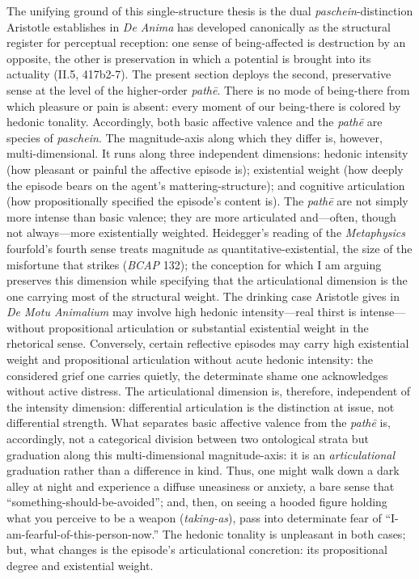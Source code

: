 \documentclass{article}
\begin{document}
The unifying ground of this single-structure thesis is the dual \textit{paschein}-distinction Aristotle establishes in \textit{De Anima} has developed canonically as the structural register for perceptual reception: one sense of being-affected is destruction by an opposite, the other is preservation in which a potential is brought into its actuality (II.5, 417b2-7). The present section deploys the second, preservative sense at the level of the higher-order \textit{pathē}. There is no mode of being-there from which pleasure or pain is absent: every moment of our being-there is colored by hedonic tonality. Accordingly, both basic affective valence and the \textit{pathē} are species of \textit{paschein}. The magnitude-axis along which they differ is, however, multi-dimensional. It runs along three independent dimensions: hedonic intensity (how pleasant or painful the affective episode is); existential weight (how deeply the episode bears on the agent's mattering-structure); and cognitive articulation (how propositionally specified the episode's content is). The \textit{pathē} are not simply more intense than basic valence; they are more articulated and---often, though not always---more existentially weighted. Heidegger's reading of the \textit{Metaphysics} fourfold's fourth sense treats magnitude as quantitative-existential, the size of the misfortune that strikes (\textit{BCAP} 132); the conception for which I am arguing preserves this dimension while specifying that the articulational dimension is the one carrying most of the structural weight. The drinking case Aristotle gives in \textit{De Motu Animalium} may involve high hedonic intensity---real thirst is intense---without propositional articulation or substantial existential weight in the rhetorical sense. Conversely, certain reflective episodes may carry high existential weight and propositional articulation without acute hedonic intensity: the considered grief one carries quietly, the determinate shame one acknowledges without active distress. The articulational dimension is, therefore, independent of the intensity dimension: differential articulation is the distinction at issue, not differential strength. What separates basic affective valence from the \textit{pathē} is, accordingly, not a categorical division between two ontological strata but graduation along this multi-dimensional magnitude-axis: it is an \textit{articulational} graduation rather than a difference in kind. Thus, one might walk down a dark alley at night and experience a diffuse uneasiness or anxiety, a bare sense that ``something-should-be-avoided''; and, then, on seeing a hooded figure holding what you perceive to be a weapon (\textit{taking-as}), pass into determinate fear of ``I-am-fearful-of-this-person-now.'' The hedonic tonality is unpleasant in both cases; but, what changes is the episode's articulational concretion: its propositional degree and existential weight. 
\end{document}
